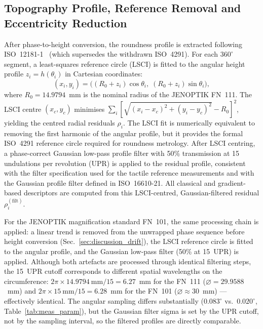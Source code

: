 \documentclass[review]{elsarticle}
\providecommand{\DIFaddtex}[1]{{\protect\color{blue}\uwave{#1}}} %
\providecommand{\DIFaddbegin}{} %
\providecommand{\DIFaddend}{} %
\providecommand{\DIFadd}[1]{\texorpdfstring{\DIFaddtex{#1}}{#1}} %
\newcommand{\DIFaddincludegraphics}[2][]{{\color{blue}\fbox{\DIFOincludegraphics[#1]{#2}}}} %
\DeclareRobustCommand{\DIFaddbegin}{\DIFOaddbegin \let\includegraphics\DIFaddincludegraphics} %
\DeclareRobustCommand{\DIFaddend}{\DIFOaddend \let\includegraphics\DIFOincludegraphics} %
\begin{document}
\subsection{Topography Profile, Reference Removal and Eccentricity Reduction}
\label{sec:topography}
After phase-to-height conversion, the roundness profile is extracted following ISO~12181-1~\cite{ISO12181-1} (which supersedes the withdrawn ISO~4291\DIFaddbegin \DIFadd{~\mbox{%
\cite{ISO4291}}\hskip0pt%
}\DIFaddend ). For each $360^\circ$ segment, a least-squares reference circle (LSCI) is fitted to the angular height profile $z_i = h(\theta_i)$ in Cartesian coordinates:
\begin{equation}
(x_i, y_i) = \big((R_0 + z_i)\cos\theta_i,\; (R_0 + z_i)\sin\theta_i\big),
\end{equation}
where $R_0 = 14.9794$~mm is the nominal radius of the JENOPTIK FN~111. The LSCI centre $(x_c, y_c)$ minimises $\sum_i [\sqrt{(x_i-x_c)^2+(y_i-y_c)^2} - R_0]^2$, yielding the centred radial residuals $\rho_i$. The LSCI fit is numerically equivalent to removing the first harmonic of the angular profile, but it provides the formal ISO~4291 reference circle required for roundness metrology. After LSCI centring, a phase-correct Gaussian low-pass profile filter with 50\% transmission at 15 undulations per revolution (UPR) is applied to the residual profile, consistent with the filter specification used for the tactile reference measurements and with the Gaussian profile filter defined in ISO~16610-21\DIFaddbegin \DIFadd{:2025~\mbox{%
\cite{ISO16610-21}}\hskip0pt%
}\DIFaddend . All classical and gradient-based descriptors are computed from this LSCI-centred, Gaussian-filtered residual $\rho_i^{(\mathrm{filt})}$.

For the JENOPTIK magnification standard FN~101, the same processing chain is applied: a linear trend is removed from the unwrapped phase sequence before height conversion (Sec.~\ref{sec:discussion_drift}), the LSCI reference circle is fitted to the angular profile, and the Gaussian low-pass filter (50\% at 15~UPR) is applied. Although both artefacts are processed through identical filtering steps, the 15~UPR cutoff corresponds to different spatial wavelengths on the circumference: $2\pi \times 14.9794~\mathrm{mm}/15 = 6.27$~mm for the FN~111 ($\varnothing=29.9588$~mm) and $2\pi \times 15~\mathrm{mm}/15 = 6.28$~mm for the FN~101 ($\varnothing \approx 30$~mm) — effectively identical. The angular sampling differs substantially ($0.083^\circ$ vs.\ $0.020^\circ$, Table~\ref{tab:meas_param}), but the Gaussian filter sigma is set by the UPR cutoff, not by the sampling interval, so the filtered profiles are directly comparable.
\end{document}

